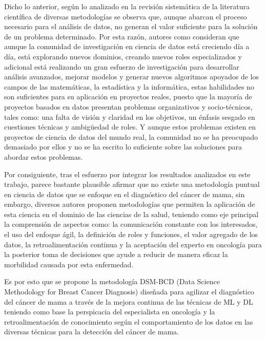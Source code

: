 Dicho lo anterior, según lo analizado en la revisión sistemática de la literatura científica de diversas metodologías se observa que, aunque abarcan el proceso necesario para el análisis de datos, no generan el valor suficiente para la solución de un problema determinado. Por esta razón, autores como \cite{Martinez2021} consideran que aunque la comunidad de investigación en ciencia de datos está creciendo día a día, está explorando nuevos dominios, creando nuevos roles especializados y adicional está realizando un gran esfuerzo de investigación para desarrollar análisis avanzados, mejorar modelos y generar nuevos algoritmos apoyados de los campos de las matemáticas, la estadística y la informática, estas habilidades no son suficientes para su aplicación en proyectos reales, puesto que la mayoría de proyectos basados en datos presentan problemas organizativos y socio-técnicos, tales como: una falta de visión y claridad en los objetivos, un énfasis sesgado en cuestiones técnicas y ambigüedad de roles. Y aunque estos problemas existen en proyectos de ciencia de datos del mundo real, la comunidad no se ha preocupado demasiado por ellos y no se ha escrito lo suficiente sobre las soluciones para abordar estos problemas.

\newpage
Por consiguiente, tras el esfuerzo por integrar los resultados analizados en este trabajo, parece bastante plausible afirmar que no existe una metodología puntual en ciencia de datos que se enfoque en el diagnóstico del cáncer de mama, sin embargo, diversos autores proponen metodologías que permiten la aplicación de esta ciencia en el dominio de las ciencias de la salud, teniendo como eje principal la comprensión de aspectos como: la comunicación constante con los interesados, el uso del enfoque ágil, la definición de roles y funciones, el valor agregado de los datos, la retroalimentación continua y la aceptación del experto en oncología para la posterior toma de decisiones que ayude a reducir de manera eficaz la morbilidad causada por esta enfermedad. 

Es por esto que se propone la metodología DSM-BCD (Data Science Methodology for Breast Cancer Diagnosis) diseñada para agilizar el diagnóstico del cáncer de mama a través de la mejora continua de las técnicas de ML y DL teniendo como base la perspicacia del especialista en oncología y la retroalimentación  de conocimiento según el comportamiento de los datos en las diversas técnicas para la detección del cáncer de mama.

